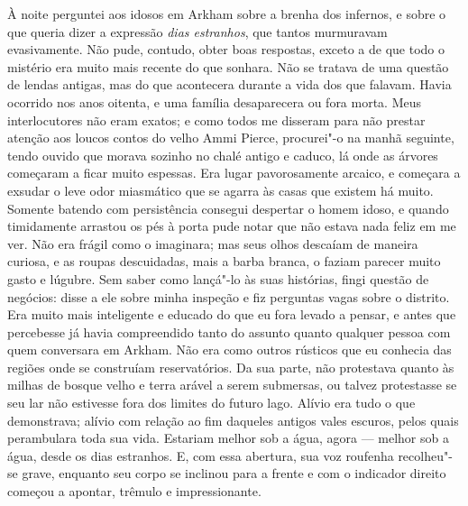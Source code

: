 À noite perguntei aos idosos em Arkham sobre a brenha dos infernos, e
sobre o que queria dizer a expressão \textit{dias estranhos}, que tantos
murmuravam evasivamente. Não pude, contudo, obter boas respostas, exceto
a de que todo o mistério era muito mais recente do que sonhara. Não se
tratava de uma questão de lendas antigas, mas do que acontecera durante
a vida dos que falavam. Havia ocorrido nos anos oitenta, e uma família
desaparecera ou fora morta. Meus interlocutores não eram exatos; e como
todos me disseram para não prestar atenção aos loucos contos do velho
Ammi Pierce, procurei"-o na manhã seguinte, tendo ouvido que morava
sozinho no chalé antigo e caduco, lá onde as árvores começaram a ficar
muito espessas. Era lugar pavorosamente arcaico, e começara a exsudar o
leve odor miasmático que se agarra às casas que existem há muito.
Somente batendo com persistência consegui despertar o homem idoso, e
quando timidamente arrastou os pés à porta pude notar que não estava
nada feliz em me ver. Não era frágil como o imaginara; mas seus olhos
descaíam de maneira curiosa, e as roupas descuidadas, mais a barba
branca, o faziam parecer muito gasto e lúgubre. Sem saber como lançá"-lo
às suas histórias, fingi questão de negócios: disse a ele sobre minha
inspeção e fiz perguntas vagas sobre o distrito. Era muito mais
inteligente e educado do que eu fora levado a pensar, e antes que
percebesse já havia compreendido tanto do assunto quanto qualquer pessoa
com quem conversara em Arkham. Não era como outros rústicos que eu
conhecia das regiões onde se construíam reservatórios. Da sua parte, não
protestava quanto às milhas de bosque velho e terra arável a serem
submersas, ou talvez protestasse se seu lar não estivesse fora dos
limites do futuro lago. Alívio era tudo o que demonstrava; alívio com
relação ao fim daqueles antigos vales escuros, pelos quais perambulara
toda sua vida. Estariam melhor sob a água, agora --- melhor sob a água,
desde os dias estranhos. E, com essa abertura, sua voz roufenha
recolheu"-se grave, enquanto seu corpo se inclinou para a frente e com o
indicador direito começou a apontar, trêmulo e impressionante.

